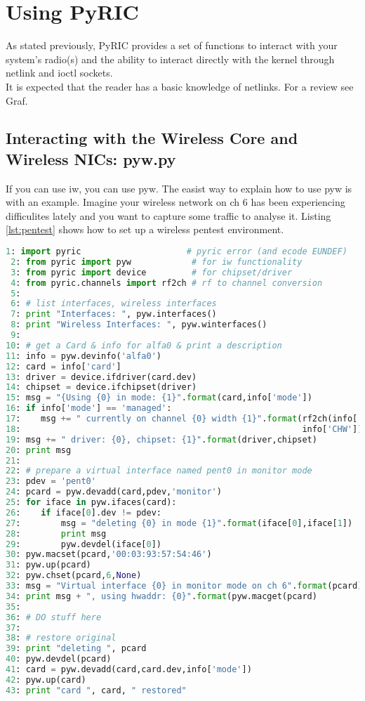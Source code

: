\documentclass[11pt]{article}
\begin{document}
\section{Using PyRIC}\label{sec:using}
As stated previously, PyRIC provides a set of functions to interact with your 
system's radio(s) and the ability to interact directly with the kernel through
netlink and ioctl sockets. \\

It is expected that the reader has a basic knowledge of netlinks. For a 
review see Graf\cite{libnl}. 

\subsection{Interacting with the Wireless Core and Wireless NICs: pyw.py}
If you can use iw, you can use pyw. The easist way to explain how to use pyw is 
with an example. Imagine your wireless network on ch 6 has been experiencing 
difficulites lately and you want to capture some traffic to analyse it. Listing 
\ref{lst:pentest} shows how to set up a wireless pentest environment. \\

\begin{lstlisting}[caption={Setting up a Wireless Pentest Environment},
                   label={lst:pentest},
                   language=Python]
 1: import pyric                     # pyric error (and ecode EUNDEF)
 2: from pyric import pyw            # for iw functionality
 3: from pyric import device         # for chipset/driver
 4: from pyric.channels import rf2ch # rf to channel conversion
 5:
 6: # list interfaces, wireless interfaces
 7: print "Interfaces: ", pyw.interfaces()
 8: print "Wireless Interfaces: ", pyw.winterfaces()
 9:
10: # get a Card & info for alfa0 & print a description
11: info = pyw.devinfo('alfa0') 
12: card = info['card']
13: driver = device.ifdriver(card.dev)
14: chipset = device.ifchipset(driver)
15: msg = "{Using {0} in mode: {1}".format(card,info['mode'])
16: if info['mode'] == 'managed':
17:    msg += " currently on channel {0} width {1}".format(rf2ch(info['RF']),
18:                                                        info['CHW'])
19: msg += " driver: {0}, chipset: {1}".format(driver,chipset)
20: print msg
21:
22: # prepare a virtual interface named pent0 in monitor mode
23: pdev = 'pent0'
24: pcard = pyw.devadd(card,pdev,'monitor')
25: for iface in pyw.ifaces(card):
26:    if iface[0].dev != pdev:
27:        msg = "deleting {0} in mode {1}".format(iface[0],iface[1])
28:        print msg
29:        pyw.devdel(iface[0])
30: pyw.macset(pcard,'00:03:93:57:54:46')
31: pyw.up(pcard)
32: pyw.chset(pcard,6,None)
33: msg = "Virtual interface {0} in monitor mode on ch 6".format(pcard)
34: print msg + ", using hwaddr: {0}".format(pyw.macget(pcard)
35: 
36: # DO stuff here
37:
38: # restore original
39: print "deleting ", pcard
40: pyw.devdel(pcard)
41: card = pyw.devadd(card,card.dev,info['mode'])
42: pyw.up(card)
43: print "card ", card, " restored"   
\end{lstlisting}
\end{document}
